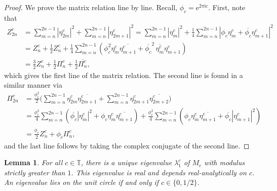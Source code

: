 \documentclass[11pt,reqno]{amsart}
\theoremstyle{plain}
\newtheorem{lemma}[theorem]{Lemma}
\theoremstyle{definition}
\newcommand{\T}{{\mathbb T}}
\newcommand{\im}{{\mathrm{i}}}
\newcommand{\me}{\mathrm{e}}
\begin{document}
\begin{proof}
We prove the matrix relation line by line. Recall,  $\phi_{c}=\me^{2 \pi \im c}$.  First, note that
\begin{align*}
Z^{c}_{2n} &= \sum_{m = n}^{2n -1} \left|\eta^{c}_{2m}\right|^2 + \sum_{m = n}^{2n-1} \left|\eta^{c}_{2m+1}\right|^2
 = \sum_{m =n}^{2n-1} \left|\eta^{c}_m\right|^2 + \frac{1}{4}\sum_{m = n}^{2n-1} \left| \phi_{c} \eta^{c}_m + \overline{\phi_{c}} \eta^{c}_{m+1}\right|^2
 \\ & = Z^{c}_n + \frac{1}{2} Z^{c}_n + \frac{1}{4} \sum_{m = n}^{2n-1} \left(\phi_{c}^2 \eta^{c}_m \overline{\eta^{c}_{m+1}} + \overline{\phi_{c}}^2\, \overline{\eta^{c}_m} \eta^{c}_{m+1}\right) 
 \\ & = \frac{3}{2} Z^{c}_n + \frac{1}{2} \Pi^{c}_n + \frac{1}{2} \overline{\Pi^{c}_n},
\end{align*}
which gives the first line of the matrix relation. The second line is found in a similar manner via
\begin{align*}
\Pi^{c}_{2n} & = \frac{\phi_{c}^2}{2} \biggl( \sum_{m=n}^{2n-1} \eta^{c}_{2m} \overline{\eta^{c}_{2m+1}} + \sum_{m = n}^{2n-1} \eta^{c}_{2m+1} \overline{\eta^{c}_{2m+2}} \biggr)
\\ & = \frac{\phi_{c}^2}{4} \sum_{m=n}^{2n-1} \left(\overline{\phi_{c}} |\eta^{c}_m|^2 + \phi_{c} \eta^{c}_m \overline{\eta^{c}_{m+1}} \right)
+ \frac{\phi_{c}^2}{4} \sum_{m=n}^{2n-1} \left(\phi_{c} \eta^{c}_m \overline{\eta^{c}_{m+1}} + \overline{\phi_{c}} |\eta^{c}_{m+1}|^2 \right)
\\ & = \frac{\phi_{c}}{2} Z^{c}_n + \phi_{c} \Pi^{c}_n,
\end{align*}
and the last line follows by taking the complex conjugate of the second line.
\end{proof}


\begin{lemma}
\label{LEM:M-eigenvalues}
For all $c\in \T$, there is a unique   eigenvalue $\lambda_1^c$ of $M_{c}$ with modulus strictly greater than $1$. This eigenvalue is  real and  depends  real-analytically on $c$. An eigenvalue lies on the unit circle  if and only if $c\in \{0,1/2\}$. 
\end{lemma}
\end{document}
